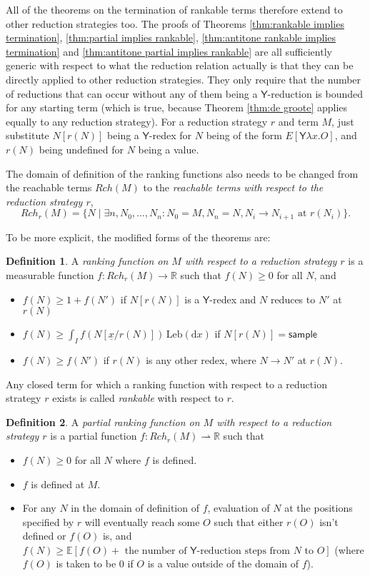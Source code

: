 \documentclass{article}
\newcommand\Leb{\mathrm{Leb}}
\newcommand{\tY}{\mathsf{Y}}
\newcommand{\tsample}{\mathsf{sample}}
\theoremstyle{definition}
\newtheorem{definition}{Definition}
\theoremstyle{lemma}
\theoremstyle{remark}
\begin{document}
All of the theorems on the termination of rankable terms therefore extend to other reduction strategies too. The proofs of Theorems \ref{thm:rankable implies termination}, \ref{thm:partial implies rankable}, \ref{thm:antitone rankable implies termination} and \ref{thm:antitone partial implies rankable} are all sufficiently generic with respect to what the reduction relation actually is that they can be directly applied to other reduction strategies. They only require that the number of reductions that can occur without any of them being a $\tY$-reduction is bounded for any starting term (which is true, because Theorem \ref{thm:de groote} applies equally to any reduction strategy). For a reduction strategy $r$ and term $M$, just substitute $N[r(N)]$ being a $\tY$-redex for $N$ being of the form $E[\tY \lambda x. O]$, and $r(N)$ being undefined for $N$ being a value.

The domain of definition of the ranking functions also needs to be changed from the reachable terms $Rch(M)$ to the \emph{reachable terms with respect to the reduction strategy $r$},
\[
Rch_r(M) = \{N \mid \exists n, N_0, \dots, N_n: N_0 = M, N_n = N, N_i \to N_{i+1} \text{ at } r(N_i)\}.
\]

To be more explicit, the modified forms of the theorems are:
\begin{definition}\rm
A \emph{ranking function on $M$ with respect to a reduction strategy $r$} is a measurable function $f:\mathit{Rch}_r(M) \to \mathbb{R}$ such that $f(N) \geq 0$ for all $N$, and
\begin{itemize}
    \item $f(N) \geq 1+ f(N')$ if $N[r(N)]$ is a $\tY$-redex and $N$ reduces to $N'$ at $r(N)$
    \item $f(N) \geq \int_I f(N[\underline{x}/r(N)]) \, \Leb(\mathrm{d}x)$ if $N[r(N)] = \tsample$

    \item $f(N) \geq f(N')$ if $r(N)$ is any other redex, where $N \to N'$ at $r(N)$.
\end{itemize}
Any closed term for which a ranking function with respect to a reduction strategy $r$ exists is called \emph{rankable} with respect to $r$. 
\end{definition}

\begin{definition}
A \emph{partial ranking function on $M$ with respect to a reduction strategy $r$} is a partial function $f : Rch_r(M) \rightharpoonup \mathbb R$ such that
\begin{itemize}
    \item $f(N) \geq 0$ for all $N$ where $f$ is defined.
    \item $f$ is defined at $M$.
    \item For any $N$ in the domain of definition of $f$, evaluation of $N$ at the positions specified by $r$ will eventually reach some $O$ such that either $r(O)$ isn't defined or $f(O)$ is, and $f(N) \geq \mathbb E[f(O) + \text{ the number of $\tY$-reduction steps from $N$ to $O$}]$ (where $f(O)$ is taken to be 0 if $O$ is a value outside of the domain of $f$).
\end{itemize}
\end{definition}
\end{document}
